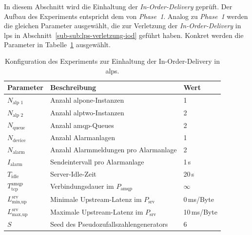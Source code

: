 In diesem Abschnitt wird die Einhaltung der \textit{In-Order-Delivery} geprüft. Der Aufbau des Experiments entspricht dem von \textit{Phase~1}. Analog zu \textit{Phase~1} werden die gleichen Parameter ausgewählt, die zur Verletzung der \textit{In-Order-Delivery} in \gls{lps} in Abschnitt~\ref{sub-sub:lps-verletzung-iod} geführt haben. Konkret werden die Parameter in Tabelle~\ref{tab:exp-alps-iod-config} ausgewählt.

\begin{table}[H]
    \centering
    \renewcommand{\arraystretch}{1.2}
    \caption{Konfiguration des Experiments zur Einhaltung der In-Order-Delivery in \acrshort{alps}.}
    \label{tab:exp-alps-iod-config}
    \begin{tabular}{|l|l|l|}
        \hline
        \textbf{Parameter}               & \textbf{Beschreibung}                        & \textbf{Wert} \\
        \hline
        $N_{\text{alp~1}}$               & Anzahl \gls{alpone}-Instanzen                & 1             \\
        $N_{\text{alp~2}}$               & Anzahl \gls{alptwo}-Instanzen                & 2             \\
        $N_{\text{queue}}$               & Anzahl \gls{amqp}-Queues                     & 2             \\
        $N_{\text{device}}$              & Anzahl Alarmanlagen                          & 1             \\
        $N_{\text{alarm}}$               & Anzahl Alarmmeldungen pro Alarmanlage        & 2             \\
        $I_{\text{alarm}}$               & Sendeintervall pro Alarmanlage               & 1\,s          \\
        $T_{\text{idle}}$                & Server-Idle-Zeit                             & 20\,s         \\
        $T_{\text{tcp}}^{\text{amqp}}$   & Verbindungsdauer im $P_{\text{amqp}}$        & $\infty$      \\
        $L_{\text{min,up}}^{\text{srv}}$ & Minimale Upstream-Latenz im $P_{\text{srv}}$ & 0\,ms/Byte    \\
        $L_{\text{max,up}}^{\text{srv}}$ & Maximale Upstream-Latenz im $P_{\text{srv}}$ & 10\,ms/Byte   \\
        $S$                              & Seed des Pseudozufallszahlengenerators       & 6             \\
        \hline
    \end{tabular}
\end{table}

